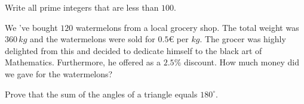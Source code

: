 \begin{exercise}
\item  Write all prime integers that are less than $100$.
\item We 've bought $120$ watermelons from a local grocery shop. The total weight was $360\, kg$ and the watermelons were sold for $0.5\euro$ per $kg$. The grocer was highly delighted from this and decided to dedicate himself to the black art of Mathematics. Furthermore, he offered as a $2.5\%$ discount. How much money did we gave for the watermelons?
\item Prove that the sum of the angles of a triangle equals $180^\circ$.
\end{exercise}